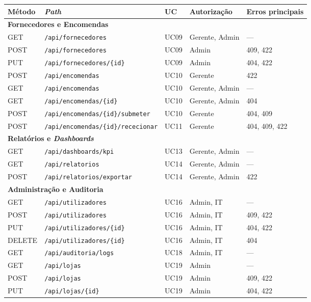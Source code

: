 \begin{table}[H]
\centering\scriptsize
\renewcommand{\arraystretch}{1.05}
\begin{adjustbox}{max width=\textwidth}
\begin{tabular}{|p{1.4cm}|p{5cm}|p{1.2cm}|p{2.3cm}|p{2.2cm}|}
\hline
\textbf{Método} & \textbf{\textit{Path}} & \textbf{UC} & \textbf{Autorização} & \textbf{Erros principais} \\
\hline

\multicolumn{5}{|l|}{\cellcolor{gray!15}\textbf{Fornecedores e Encomendas}} \\
\hline
GET & \texttt{/api/fornecedores} & UC09 & Gerente, Admin & --- \\
\hline
POST & \texttt{/api/fornecedores} & UC09 & Admin & 409, 422 \\
\hline
PUT & \texttt{/api/fornecedores/\{id\}} & UC09 & Admin & 404, 422 \\
\hline
POST & \texttt{/api/encomendas} & UC10 & Gerente & 422 \\
\hline
GET & \texttt{/api/encomendas} & UC10 & Gerente, Admin & --- \\
\hline
GET & \texttt{/api/encomendas/\{id\}} & UC10 & Gerente, Admin & 404 \\
\hline
POST & \texttt{/api/encomendas/\{id\}/submeter} & UC10 & Gerente & 404, 409 \\
\hline
POST & \texttt{/api/encomendas/\{id\}/rececionar} & UC11 & Gerente & 404, 409, 422 \\
\hline

\multicolumn{5}{|l|}{\cellcolor{gray!15}\textbf{Relatórios e \textit{Dashboards}}} \\
\hline
GET & \texttt{/api/dashboards/kpi} & UC13 & Gerente, Admin & --- \\
\hline
GET & \texttt{/api/relatorios} & UC14 & Gerente, Admin & --- \\
\hline
POST & \texttt{/api/relatorios/exportar} & UC14 & Gerente, Admin & 422 \\
\hline

\multicolumn{5}{|l|}{\cellcolor{gray!15}\textbf{Administração e Auditoria}} \\
\hline
GET & \texttt{/api/utilizadores} & UC16 & Admin, IT & --- \\
\hline
POST & \texttt{/api/utilizadores} & UC16 & Admin, IT & 409, 422 \\
\hline
PUT & \texttt{/api/utilizadores/\{id\}} & UC16 & Admin, IT & 404, 422 \\
\hline
DELETE & \texttt{/api/utilizadores/\{id\}} & UC16 & Admin, IT & 404 \\
\hline
GET & \texttt{/api/auditoria/logs} & UC18 & Admin, IT & --- \\
\hline
GET & \texttt{/api/lojas} & UC19 & Admin & --- \\
\hline
POST & \texttt{/api/lojas} & UC19 & Admin & 409, 422 \\
\hline
PUT & \texttt{/api/lojas/\{id\}} & UC19 & Admin & 404, 422 \\
\hline


\end{tabular}
\end{adjustbox}
\end{table}
